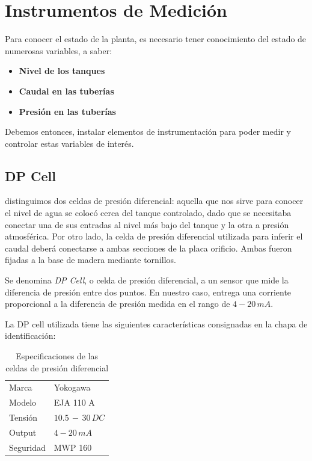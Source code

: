 \section{Instrumentos de Medición}
\label{sec:InstrumentosMedicion}
Para conocer el estado de la planta, es necesario tener conocimiento del
estado de numerosas variables, a saber:
\begin{itemize}
 \item \textbf{Nivel de los tanques}
 \item \textbf{Caudal en las tuberías}
 \item \textbf{Presión en las tuberías}
\end{itemize}
Debemos entonces, instalar elementos de instrumentación para poder 
medir y controlar estas variables de interés.

\subsection{DP Cell}
\label{subsec:DPCell}
 distinguimos dos celdas de presión diferencial:
  aquella que nos sirve para conocer el nivel de agua se colocó cerca del 
  tanque controlado, dado que se necesitaba conectar una de sus entradas al 
  nivel más bajo del tanque y la otra a presión atmosférica. 
  Por otro lado, la celda de presión diferencial utilizada para inferir el 
  caudal deberá conectarse a ambas secciones de la placa orificio.
  Ambas fueron fijadas a la base de madera mediante tornillos.

Se denomina \textit{DP Cell}, o celda de presión diferencial, a un sensor
que mide la diferencia de presión entre dos puntos.
En nuestro caso, entrega una corriente proporcional a la diferencia de presión 
medida en el rango de $4-20\,mA$.

La DP cell utilizada tiene las siguientes características consignadas en 
la chapa de identificación:

\begin{table}
\centering
\begin{tabular}{|l|l|}
\hline
Marca & Yokogawa\\
Modelo & EJA 110 A\\
Tensión & $10.5\,-\,30 \, DC$\\
Output & $4-20\,mA$\\
Seguridad & MWP 160\\
\hline
\end{tabular}
\caption{Especificaciones de las celdas de presión diferencial}
\end{table}


